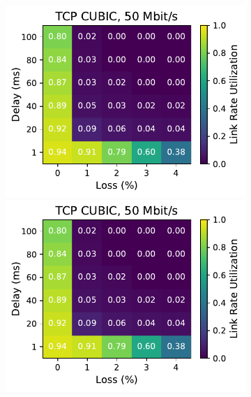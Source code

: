 \begin{figure}[ht]
\begin{subfigure}[b]{0.89cm}
        \includegraphics[width=\linewidth,trim={8cm 0 0 0},clip]{splitting-paper/figures/heatmaps/heatmap_tcp_cubic_50mbps.pdf}
        \includegraphics[width=\linewidth,trim={8cm 0 0 0},clip]{splitting-paper/figures/heatmaps/heatmap_tcp_cubic_50mbps.pdf}

\end{subfigure}
\end{figure}
